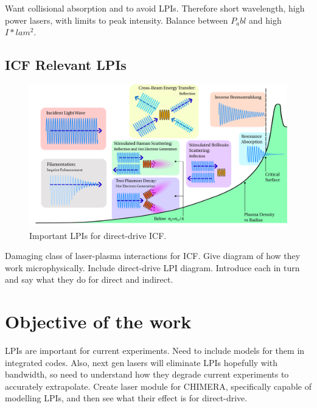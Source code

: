 Want collisional absorption and to avoid LPIs.
Therefore short wavelength, high power lasers, with limits to peak intensity.
Balance between $P_abl$ and high $I*lam^2$.

\subsection{ICF Relevant LPIs}%
\label{sec:intro_LPIs}

\begin{figure}[t!]
    \includegraphics[width=\linewidth]{Introduction/Images/LPI diagram.png}
    \centering
    \caption{Important \ac{LPIs} for direct-drive \ac{ICF}.
    }%
    \label{fig:intro_dd_lpis}
\end{figure}

Damaging class of laser-plasma interactions for ICF.
Give diagram of how they work microphysically.
Include direct-drive LPI diagram.
Introduce each in turn and say what they do for direct and indirect.

\section{Objective of the work}%
\label{sec:intro_objective}

LPIs are important for current experiments.
Need to include models for them in integrated codes.
Also, next gen lasers will eliminate LPIs hopefully with bandwidth, so need to understand how they degrade current experiments to accurately extrapolate.
Create laser module for CHIMERA, specifically capable of modelling LPIs, and then see what their effect is for direct-drive.
